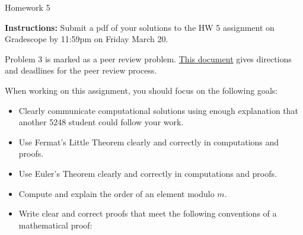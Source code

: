 \documentclass[12pt]{article}
\begin{document}
\begin{center}
{\Large Homework 5}\\


\end{center}
{\bf Instructions:} Submit a pdf of your solutions to the HW 5 assignment on Gradescope by 11:59pm on Friday March 20. 

Problem 3 is marked as a peer review problem. \href{https://docs.google.com/document/d/1jSw9pmMJJFUx_6dTkcUi4k4HJNIrrIIgs9zdWhAycx0/edit?usp=drive_link}{This document} gives directions and deadlines for the peer review process.

When working on this assignment, you should focus on the following goals:
\begin{itemize}
\item Clearly communicate computational solutions using enough explanation that another 5248 student could follow your work.
\item Use Fermat's Little Theorem clearly and correctly in computations and proofs.
\item Use Euler's Theorem clearly and correctly in computations and proofs. 
\item Compute and explain the order of an element modulo $m$. 
\item Write clear and correct proofs that meet the following conventions of a mathematical proof:
\end{itemize}
\end{document}
